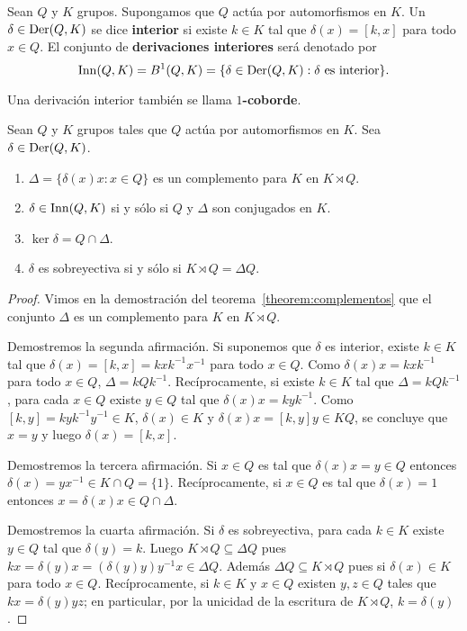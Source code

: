 \begin{definition}
	Sean $Q$ y $K$ grupos. Supongamos que $Q$ actúa por automorfismos en $K$.
	Un $\delta\in\operatorname{Der}(Q,K)$ se dice \textbf{interior} si existe $k\in K$ tal
	que $\delta(x)=[k,x]$ para todo $x\in Q$. El conjunto de
	\textbf{derivaciones interiores} será denotado por
	\[
		\mathrm{Inn}(Q,K)=B^1(Q,K)=\{\delta\in\operatorname{Der}(Q,K):\text{$\delta$ es interior}\}.
	\]
\end{definition}

Una derivación interior también se llama \textbf{$1$-coborde}.

\begin{theorem}[Sysak]
	\label{theorem:Sysak}
	Sean $Q$ y $K$ grupos tales que $Q$ actúa por automorfismos en $K$. Sea
	$\delta\in\operatorname{Der}(Q,K)$.
	\begin{enumerate}
		\item $\Delta=\{\delta(x)x:x\in Q\}$ es un complemento para $K$ en $K\rtimes Q$.
		\item $\delta\in\mathrm{Inn}(Q,K)$ si y sólo si $Q$ y $\Delta$ son conjugados en
			$K$.
		\item $\ker\delta=Q\cap\Delta$.
		\item $\delta$ es sobreyectiva si y sólo si $K\rtimes Q=\Delta Q$.
	\end{enumerate}
\end{theorem}

\begin{proof}
	Vimos en la demostración del teorema~\ref{theorem:complementos} que
	el conjunto $\Delta$ es un complemento para $K$ en $K\rtimes Q$. 

	Demostremos la segunda afirmación. Si suponemos que $\delta$ es interior,
	existe $k\in K$ tal que $\delta(x)=[k,x]=kxk^{-1}x^{-1}$ para todo $x\in
	Q$. Como $\delta(x)x=kxk^{-1}$ para todo $x\in Q$,  $\Delta=kQk^{-1}$.
	Recíprocamente, si existe $k\in K$ tal que $\Delta=kQk^{-1}$, para cada
	$x\in Q$ existe $y\in Q$ tal que $\delta(x)x=kyk^{-1}$. Como
	$[k,y]=kyk^{-1}y^{-1}\in K$, $\delta(x)\in K$ y $\delta(x)x=[k,y]y\in KQ$,
	se concluye que $x=y$ y luego $\delta(x)=[k,x]$. 

	Demostremos la tercera afirmación. Si $x\in Q$ es tal que $\delta(x)x=y\in
	Q$ entonces $\delta(x)=yx^{-1}\in K\cap Q=\{1\}$. Recíprocamente, si $x\in Q$
	es tal que $\delta(x)=1$ entonces $x=\delta(x)x\in Q\cap\Delta$. 

	Demostremos la cuarta afirmación. Si $\delta$ es sobreyectiva, para cada
	$k\in K$ existe $y\in Q$ tal que $\delta(y)=k$. Luego $K\rtimes Q\subseteq
	\Delta Q$ pues $kx=\delta(y)x=(\delta(y)y)y^{-1}x\in \Delta Q$. Además
	$\Delta Q\subseteq K\rtimes Q$ pues si $\delta(x)\in K$ para todo $x\in Q$.
	Recíprocamente, si $k\in K$ y $x\in Q$ existen 
	$y,z\in Q$ tales que $kx=\delta(y)yz$; en particular, 
	por la unicidad de la escritura de $K\rtimes Q$,
	$k=\delta(y)$. 
\end{proof}

